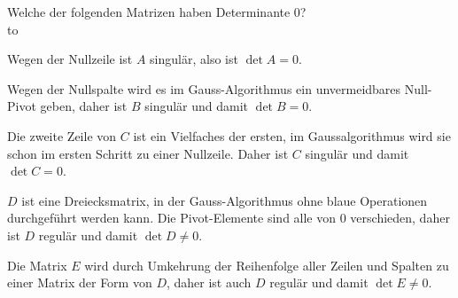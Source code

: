Welche der folgenden Matrizen haben Determinante 0?
\\
\hbox to


\begin{loesung}
\begin{teilaufgaben}
\item
Wegen der Nullzeile ist $A$ singulär, also ist $\det A = 0$.
\item
Wegen der Nullspalte wird es im Gauss-Algorithmus ein unvermeidbares 
Null-Pivot geben, daher ist $B$ singulär und damit $\det B = 0$.
\item
Die zweite Zeile von $C$ ist ein Vielfaches der ersten,
im Gaussalgorithmus wird sie schon im ersten Schritt zu einer Nullzeile.
Daher ist $C$ singulär und damit$\det C = 0$.
\item
$D$ ist eine Dreiecksmatrix, in der Gauss-Algorithmus ohne blaue Operationen
durchgeführt werden kann.
Die Pivot-Elemente sind alle von 0 verschieden, daher ist $D$ regulär
und damit $\det D \ne 0$.
\item
Die Matrix $E$ wird durch Umkehrung der Reihenfolge aller Zeilen und
Spalten zu einer Matrix der Form von $D$, daher ist auch $D$ regulär
und damit $\det E \ne 0$.
\qedhere
\end{teilaufgaben}
\end{loesung}
